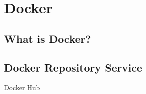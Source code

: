 \documentclass[10pt,a4j,openany,dvipdfmx]{jsarticle}
\begin{document}

\section{Docker} %
\label{sec:docker}


\subsection{What is Docker?} %
\label{sub:what_is_docker_}



\subsection{Docker Repository Service} %
\label{sub:docker_repository_service}

Docker Hub


\end{document}
